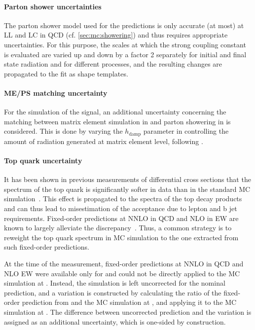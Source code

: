\paragraph{Parton shower uncertainties}

The parton shower model used for the predictions is only accurate (at most) at LL and LC in QCD (cf. \cref{sec:mc:showering}) and thus requires appropriate uncertainties. For this purpose, the scales at which the strong coupling constant is evaluated are varied up and down by a factor 2 separately for initial and final state radiation and for different processes, and the resulting changes are propagated to the fit as shape templates.

\paragraph{ME/PS matching uncertainty}

For the simulation of the \ttbar signal, an additional uncertainty concerning the matching between matrix element simulation in \powheg and parton showering in \pythia is considered. This is done by varying the $h_{\mathrm{damp}}$ parameter in \powheg controlling the amount of radiation generated at matrix element level, following .

\paragraph{Top quark \pt uncertainty}

It has been shown in previous measurements of \ttbar differential cross sections that the \pt spectrum of the top quark is significantly softer in data than in the standard \powheg MC simulation~\cite{CMS:TOP-17-014,CMS:TOP-16-007,CMS:TOP-16-008}. This effect is propagated to the \pt spectra of the top decay products and can thus lead to misestimation of the acceptance due to lepton and b jet \pt requirements. Fixed-order predictions at NNLO in QCD and NLO in EW are known to largely alleviate the discrepancy~\cite{Czakon:2017wor}. Thus, a common strategy is to reweight the top quark \pt spectrum in MC simulation to the one extracted from such fixed-order predictions.

At the time of the measurement, fixed-order predictions at NNLO in QCD and NLO EW were available only for \sqrtsRII and could not be directly applied to the MC simulation at \sqrtsRIII. Instead, the simulation is left uncorrected for the nominal prediction, and a variation is constructed by calculating the ratio of the fixed-order prediction from  and the \powheg MC simulation at \sqrtsRII, and applying it to the \powheg MC simulation at \sqrtsRIII. The difference between uncorrected prediction and the variation is assigned as an additional uncertainty, which is one-sided by construction.

